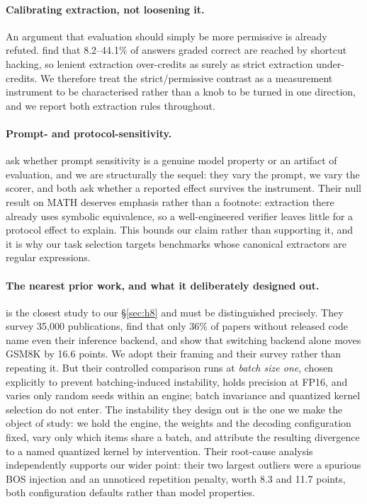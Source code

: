 \documentclass[conference]{IEEEtran}
\begin{document}
\paragraph{Calibrating extraction, not loosening it.}
An argument that evaluation should simply be more permissive is already
refuted. \citet{ren2026shortcut} find that 8.2--44.1\% of answers graded correct
are reached by shortcut hacking, so lenient extraction over-credits as surely as
strict extraction under-credits. We therefore treat the strict/permissive
contrast as a measurement instrument to be characterised rather than a knob to
be turned in one direction, and we report both extraction rules throughout.

\paragraph{Prompt- and protocol-sensitivity.}
\citet{hua2025flaw} ask whether prompt sensitivity is a genuine model property
or an artifact of evaluation, and we are structurally the sequel: they vary the
prompt, we vary the scorer, and both ask whether a reported effect survives the
instrument. Their null result on MATH deserves emphasis rather than a footnote:
extraction there already uses symbolic equivalence, so a well-engineered
verifier leaves little for a protocol effect to explain. This bounds our claim
rather than supporting it, and it is why our task selection targets benchmarks
whose canonical extractors are regular expressions.
\paragraph{The nearest prior work, and what it deliberately designed out.}
\citet{pape2026silent} is the closest study to our \S\ref{sec:h8} and must be
distinguished precisely. They survey 35{,}000 publications, find that only 36\% of
papers without released code name even their inference backend, and show that
switching backend alone moves GSM8K by 16.6 points. We adopt their framing and
their survey rather than repeating it. But their controlled comparison runs at
\emph{batch size one}, chosen explicitly to prevent batching-induced instability,
holds precision at FP16, and varies only random seeds within an engine; batch
invariance and quantized kernel selection do not enter. The instability they
design out is the one we make the object of study: we hold the engine, the
weights and the decoding configuration fixed, vary only which items share a
batch, and attribute the resulting divergence to a named quantized kernel by
intervention. Their root-cause analysis independently supports our wider point:
their two largest outliers were a spurious BOS injection and an unnoticed
repetition penalty, worth 8.3 and 11.7 points, both configuration defaults rather
than model properties.
\end{document}

